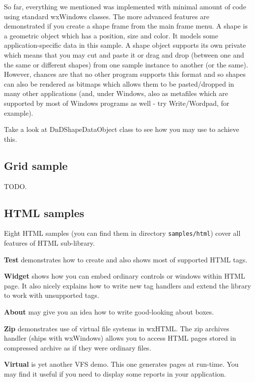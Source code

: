 So far, everything we mentioned was implemented with minimal amount of code
using standard wxWindows classes. The more advanced features are demonstrated
if you create a shape frame from the main frame menu. A shape is a geometric
object which has a position, size and color. It models some
application-specific data in this sample. A shape object supports its own
private  which means that you may cut and
paste it or drag and drop (between one and the same or different shapes) from
one sample instance to another (or the same). However, chances are that no
other program supports this format and so shapes can also be rendered as
bitmaps which allows them to be pasted/dropped in many other applications
(and, under Windows, also as metafiles which are supported by most of Windows
programs as well - try Write/Wordpad, for example).

Take a look at DnDShapeDataObject class to see how you may use 
 to achieve this.

\subsection{Grid sample}\label{samplegrid}

TODO.

\subsection{HTML samples}\label{samplehtml}

Eight HTML samples (you can find them in directory {\tt samples/html})
cover all features of HTML sub-library.

{\bf Test} demonstrates how to create 
and also shows most of supported HTML tags.

{\bf Widget} shows how you can embed ordinary controls or windows within
HTML page. It also nicely explains how to write new tag handlers and extend
the library to work with unsupported tags.

{\bf About} may give you an idea how to write good-looking about boxes.

{\bf Zip} demonstrates use of virtual file systems in wxHTML. The zip archives
handler (ships with wxWindows) allows you to access HTML pages stored 
in compressed archive as if they were ordinary files.

{\bf Virtual} is yet another VFS demo. This one generates pages at run-time.
You may find it useful if you need to display some reports in your application.

